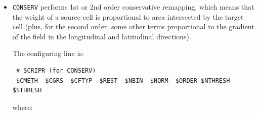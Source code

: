 \begin{itemize}
    Note that for {\tt DISTWGT}, {\tt GAUSWGT}, {\tt BILINEAR} and {\tt BICUBIC}:
    \begin{itemize}
    \item Masked target grid points: the zero value is associated to
      masked target grid points.

    \item Non-masked target grid points having some of the source
      points normally used in the interpolation
      masked: a N nearest neighbour algorithm using the remaining non
      masked source points is applied.

    \item Non-masked target grid points having all source
      points normally used in the interpolation
      masked: by default, the nearest non-masked source
      neighbour is used ({\tt ll\_nnei} is set to {\tt .true.} in the SCRIP run).
      
    \end{itemize}   

    Note that for {\tt DISTWGTNF}, {\tt GAUSWGTNF}, {\tt BILINEARNF} and {\tt BICUBICNF}:
    \begin{itemize}

    \item Identical behavior to non-NF options except that no nearest non-masked source
    neighbour fill is done ({\tt ll\_nnei} is set to {\tt .false} in the SCRIP run).
    Non-masked target grid points that do not receive any interpolated value are set to 0 .

    \end{itemize}   

  \item {\tt CONSERV} performs 1st or 2nd order conservative
    remapping, which means that the weight of a source cell is
    proportional to area intersected by the target cell (plus,  for the second order, some
    other terms proportional to the gradient of the field in the
    longitudinal and latitudinal directions).

    The configuring line is:
  \begin{verbatim}
 # SCRIPR (for CONSERV)
 $CMETH  $CGRS  $CFTYP  $REST  $NBIN  $NORM  $ORDER $NTHRESH $STHRESH
\end{verbatim}

   where:
    

\end{itemize}
